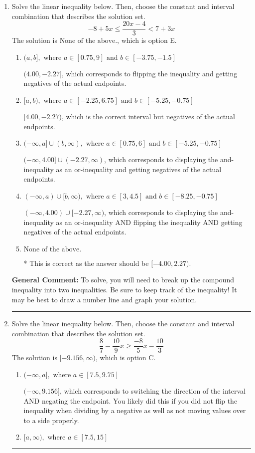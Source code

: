 \documentclass{extbook}[14pt]
\newcommand{\litem}[1]{\item #1

\rule{\textwidth}{0.4pt}}
\begin{document}
\begin{enumerate}\litem{
Solve the linear inequality below. Then, choose the constant and interval combination that describes the solution set.
\[ -8 + 5 x \leq \frac{20 x - 4}{3} < 7 + 3 x \]The solution is \( \text{None of the above.} \), which is option E.\begin{enumerate}[label=\Alph*.]
\item \( (a, b], \text{ where } a \in [0.75, 9] \text{ and } b \in [-3.75, -1.5] \)

$(4.00, -2.27]$, which corresponds to flipping the inequality and getting negatives of the actual endpoints.
\item \( [a, b), \text{ where } a \in [-2.25, 6.75] \text{ and } b \in [-5.25, -0.75] \)

$[4.00, -2.27)$, which is the correct interval but negatives of the actual endpoints.
\item \( (-\infty, a] \cup (b, \infty), \text{ where } a \in [0.75, 6] \text{ and } b \in [-5.25, -0.75] \)

$(-\infty, 4.00] \cup (-2.27, \infty)$, which corresponds to displaying the and-inequality as an or-inequality and getting negatives of the actual endpoints.
\item \( (-\infty, a) \cup [b, \infty), \text{ where } a \in [3, 4.5] \text{ and } b \in [-8.25, -0.75] \)

$(-\infty, 4.00) \cup [-2.27, \infty)$, which corresponds to displaying the and-inequality as an or-inequality AND flipping the inequality AND getting negatives of the actual endpoints.
\item \( \text{None of the above.} \)

* This is correct as the answer should be $[-4.00, 2.27)$.
\end{enumerate}

\textbf{General Comment:} To solve, you will need to break up the compound inequality into two inequalities. Be sure to keep track of the inequality! It may be best to draw a number line and graph your solution.
}
\litem{
Solve the linear inequality below. Then, choose the constant and interval combination that describes the solution set.
\[ \frac{8}{7} - \frac{10}{9} x \geq \frac{-8}{5} x - \frac{10}{3} \]The solution is \( [-9.156, \infty) \), which is option C.\begin{enumerate}[label=\Alph*.]
\item \( (-\infty, a], \text{ where } a \in [7.5, 9.75] \)

 $(-\infty, 9.156]$, which corresponds to switching the direction of the interval AND negating the endpoint. You likely did this if you did not flip the inequality when dividing by a negative as well as not moving values over to a side properly.
\item \( [a, \infty), \text{ where } a \in [7.5, 15] \)


\end{enumerate}}
\end{enumerate}
\end{document}

